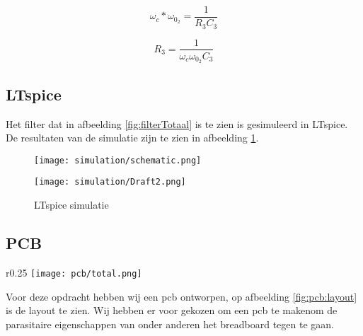 \begin{flushright}
	\begin{minipage}{0.37\textwidth}
		\begin{equation} \label{eq:rc}
			\omega_c*\omega_{0_2}=\frac{1}{R_3C_3}
		\end{equation}
	\end{minipage}
	\begin{minipage}{0.37\textwidth}
		\begin{equation} \label{eq:rcValR}
			R_3=\frac{1}{\omega_c\omega_{0_2}C_3}
		\end{equation}
	\end{minipage}
\end{flushright}
\newpage

\subsection{LTspice}
Het filter dat in afbeelding \ref{fig:filterTotaal} is te zien is gesimuleerd in LTspice. De resultaten van de simulatie zijn te zien
in afbeelding \ref{fig:simRes}.
\begin{figure}[!htb]
	\begin{minipage}{0.45\textwidth}
		\texttt{[image: simulation/schematic.png]}
		\caption{Eerste orde lp filter}
		\label{fig:filterTotaal}
	\end{minipage}
	\begin{minipage}{0.45\textwidth}
		\texttt{[image: simulation/Draft2.png]}
		\caption{LTspice simulatie}
		\label{fig:simRes}
	\end{minipage}
\end{figure}

\subsection{PCB}
	\begin{wrapfigure}[5]{r}{0.25\textwidth}
		\texttt{[image: pcb/total.png]}
		\caption{Layout}
		\label{fig:pcb:layout}
	\end{wrapfigure}
	Voor deze opdracht hebben wij een pcb ontworpen, op afbeelding \ref{fig:pcb:layout} is de layout te zien. Wij hebben er voor gekozen om een pcb te makenom de 
	parasitaire eigenschappen van onder anderen het breadboard tegen te gaan.

